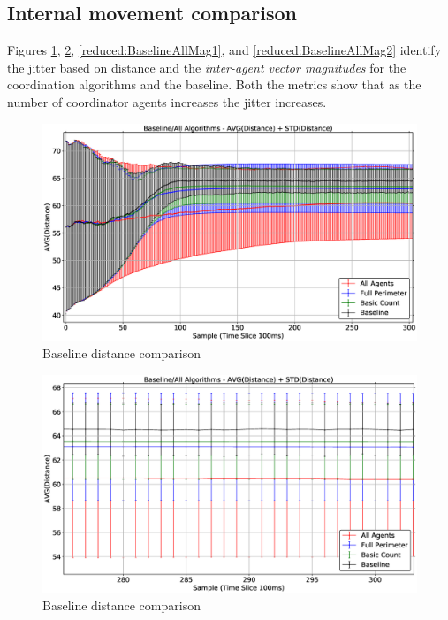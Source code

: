 \subsection{Internal movement comparison\label{section:stabilityComparison1}}
Figures \ref{reduced:BaselineAllDist1}, \ref{reduced:BaselineAllDist2}, \ref{reduced:BaselineAllMag1}, and \ref{reduced:BaselineAllMag2} identify the jitter based on distance and the \textit{inter-agent vector magnitudes} for the coordination algorithms and the baseline. Both the metrics show that as the number of coordinator agents increases the jitter increases. 

\begin{figure}[H]
\begin{center}
\includegraphics[width=14cm]{CHAPTER-6/figures/BaselineAllDist1}
\end{center}
\caption{Baseline distance comparison\label{reduced:BaselineAllDist1}}
\end{figure}

\begin{figure}[H]
\begin{center}
\includegraphics[width=14cm]{CHAPTER-6/figures/BaselineAllDist2}
\end{center}
\caption{Baseline distance comparison\label{reduced:BaselineAllDist2}}
\end{figure}

